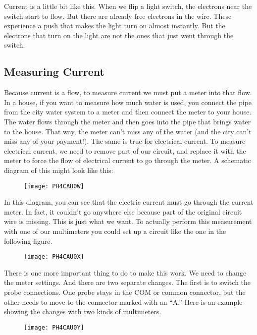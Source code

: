 Current is a little bit like this. When we flip a light switch, the electrons near the switch start to flow. But there are already free electrons in the wire. These experience a push that makes the light turn on almost instantly. But the electrons that turn on the light are not the ones
that just went through the switch. 

\subsection{Measuring Current}

Because current is a flow, to measure current we must put a meter into that flow. In a house, if you want to measure how much water is used, you connect the pipe from the city water system to a meter and then connect the meter to your house. The water flows through the meter and then goes into the pipe that brings water to the house. That way, the meter can't miss any of the water (and the city can't miss any of your payment!). The same is true for electrical current. To measure electrical current, we need to remove part of our circuit, and replace it with the meter to force the flow of electrical current to go through the meter. A schematic diagram of this might look like this: 

\begin{figure}[h!]
	\centering
    \texttt{[image: PH4CAU0W]}
\end{figure}

In this diagram, you can see that the electric current must go through the current meter. In fact, it couldn't go anywhere else because part of the original circuit wire is missing. This is just what we want. To actually perform this measurement with one of our multimeters you could set up a circuit like the one in the following figure. 

\begin{figure}[h!]
	\centering
    \texttt{[image: PH4CAU0X]}
\end{figure}

There is one more important thing to do to make this work. We need to change the meter settings. And there are two separate changes. The first is to switch the probe connections. One probe stays in the COM or common connector, but the other needs to move to the connector marked with an ``A.'' Here is an example showing the changes with two kinds of multimeters. 

\begin{figure}[h!]
    \centering
    \texttt{[image: PH4CAU0Y]}
\end{figure}

